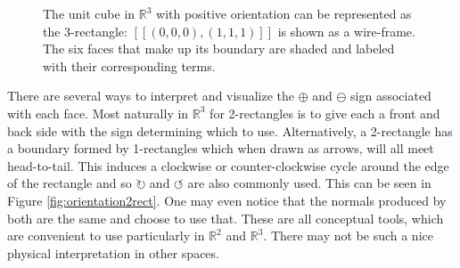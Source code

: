 \begin{figure}[ht]
	\caption[Unit cube with boundary] { 
		The unit cube in $\mathbb{R}^3$ with positive orientation can be represented as the 3-rectangle: 
		$[\![(0,0,0), (1,1,1) ]\!]$ is shown as a wire-frame. 
		The six faces that make up its boundary are shaded and labeled with their corresponding terms.
	\label{fig:cubeboundary} }
\end{figure}

There are several ways to interpret and visualize the $\oplus$ and $\ominus$ sign associated with each face.
Most naturally in $\mathbb{R}^3$ for 2-rectangles is to give each a front and back side with the sign determining which to use.
Alternatively, a 2-rectangle has a boundary formed by 1-rectangles which when drawn as arrows, will all meet head-to-tail.
This induces a clockwise or counter-clockwise cycle around the edge of the rectangle and so $\circlearrowright$ and $\circlearrowleft$ are also commonly used.
This can be seen in Figure \ref{fig:orientation2rect}.
One may even notice that the normals produced by both are the same and choose to use that.
These are all conceptual tools, which are convenient to use particularly in $\mathbb{R}^2$ and $\mathbb{R}^3$.
There may not be such a nice physical interpretation in other spaces.


